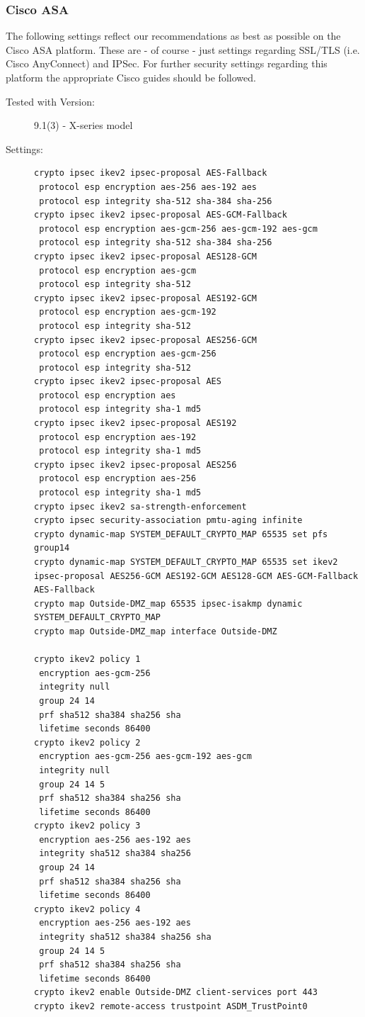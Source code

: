 \subsubsection{Cisco ASA}
The following settings reflect our recommendations as best as possible on the Cisco ASA platform. These are - of course - just settings regarding SSL/TLS (i.e. Cisco AnyConnect) and IPSec. For further security settings regarding this platform the appropriate Cisco guides should be followed.
\begin{description}
\item[Tested with Version:] 
9.1(3) - X-series model
\item[Settings:] \mbox{}
\begin{lstlisting}[breaklines]
crypto ipsec ikev2 ipsec-proposal AES-Fallback
 protocol esp encryption aes-256 aes-192 aes
 protocol esp integrity sha-512 sha-384 sha-256
crypto ipsec ikev2 ipsec-proposal AES-GCM-Fallback
 protocol esp encryption aes-gcm-256 aes-gcm-192 aes-gcm
 protocol esp integrity sha-512 sha-384 sha-256
crypto ipsec ikev2 ipsec-proposal AES128-GCM
 protocol esp encryption aes-gcm
 protocol esp integrity sha-512
crypto ipsec ikev2 ipsec-proposal AES192-GCM
 protocol esp encryption aes-gcm-192
 protocol esp integrity sha-512
crypto ipsec ikev2 ipsec-proposal AES256-GCM
 protocol esp encryption aes-gcm-256
 protocol esp integrity sha-512
crypto ipsec ikev2 ipsec-proposal AES
 protocol esp encryption aes
 protocol esp integrity sha-1 md5
crypto ipsec ikev2 ipsec-proposal AES192
 protocol esp encryption aes-192
 protocol esp integrity sha-1 md5
crypto ipsec ikev2 ipsec-proposal AES256
 protocol esp encryption aes-256
 protocol esp integrity sha-1 md5
crypto ipsec ikev2 sa-strength-enforcement
crypto ipsec security-association pmtu-aging infinite
crypto dynamic-map SYSTEM_DEFAULT_CRYPTO_MAP 65535 set pfs group14
crypto dynamic-map SYSTEM_DEFAULT_CRYPTO_MAP 65535 set ikev2 ipsec-proposal AES256-GCM AES192-GCM AES128-GCM AES-GCM-Fallback AES-Fallback
crypto map Outside-DMZ_map 65535 ipsec-isakmp dynamic SYSTEM_DEFAULT_CRYPTO_MAP
crypto map Outside-DMZ_map interface Outside-DMZ

crypto ikev2 policy 1
 encryption aes-gcm-256
 integrity null
 group 24 14
 prf sha512 sha384 sha256 sha
 lifetime seconds 86400
crypto ikev2 policy 2
 encryption aes-gcm-256 aes-gcm-192 aes-gcm
 integrity null
 group 24 14 5
 prf sha512 sha384 sha256 sha
 lifetime seconds 86400
crypto ikev2 policy 3
 encryption aes-256 aes-192 aes
 integrity sha512 sha384 sha256
 group 24 14
 prf sha512 sha384 sha256 sha
 lifetime seconds 86400
crypto ikev2 policy 4
 encryption aes-256 aes-192 aes
 integrity sha512 sha384 sha256 sha
 group 24 14 5
 prf sha512 sha384 sha256 sha
 lifetime seconds 86400
crypto ikev2 enable Outside-DMZ client-services port 443
crypto ikev2 remote-access trustpoint ASDM_TrustPoint0


\end{lstlisting}
\end{description}
